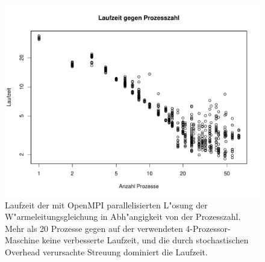 \begin{figure}
\begin{center}
\includegraphics[width=\hsize]{heat/results-heat-threads.pdf}
\end{center}
\caption{Laufzeit der mit OpenMPI parallelisierten L"osung der
W"armeleitungsgleichung in Abh"angigkeit von der Prozesszahl.
Mehr als 20 Prozesse gegen auf der verwendeten 4-Prozessor-Maschine
keine verbesserte Laufzeit, und die durch stochastischen
Overhead verursachte Streuung dominiert die Laufzeit.
\label{heat:threadzahl}}
\end{figure}

